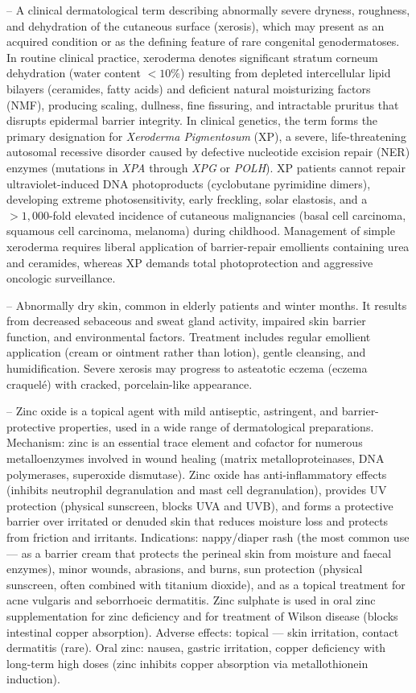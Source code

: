-- A clinical dermatological term describing abnormally severe dryness, roughness, and dehydration of the cutaneous surface (xerosis), which may present as an acquired condition or as the defining feature of rare congenital genodermatoses. In routine clinical practice, xeroderma denotes significant stratum corneum dehydration (water content $<10\%$) resulting from depleted intercellular lipid bilayers (ceramides, fatty acids) and deficient natural moisturizing factors (NMF), producing scaling, dullness, fine fissuring, and intractable pruritus that disrupts epidermal barrier integrity. In clinical genetics, the term forms the primary designation for \textit{Xeroderma Pigmentosum} (XP), a severe, life-threatening autosomal recessive disorder caused by defective nucleotide excision repair (NER) enzymes (mutations in \textit{XPA} through \textit{XPG} or \textit{POLH}). XP patients cannot repair ultraviolet-induced DNA photoproducts (cyclobutane pyrimidine dimers), developing extreme photosensitivity, early freckling, solar elastosis, and a $>1{,}000$-fold elevated incidence of cutaneous malignancies (basal cell carcinoma, squamous cell carcinoma, melanoma) during childhood. Management of simple xeroderma requires liberal application of barrier-repair emollients containing urea and ceramides, whereas XP demands total photoprotection and aggressive oncologic surveillance.

-- Abnormally dry skin, common in elderly patients and winter months. It results from decreased sebaceous and sweat gland activity, impaired skin barrier function, and environmental factors. Treatment includes regular emollient application (cream or ointment rather than lotion), gentle cleansing, and humidification. Severe xerosis may progress to asteatotic eczema (eczema craquelé) with cracked, porcelain-like appearance.

-- Zinc oxide is a topical agent with mild antiseptic, astringent, and barrier-protective properties, used in a wide range of dermatological preparations. Mechanism: zinc is an essential trace element and cofactor for numerous metalloenzymes involved in wound healing (matrix metalloproteinases, DNA polymerases, superoxide dismutase). Zinc oxide has anti-inflammatory effects (inhibits neutrophil degranulation and mast cell degranulation), provides UV protection (physical sunscreen, blocks UVA and UVB), and forms a protective barrier over irritated or denuded skin that reduces moisture loss and protects from friction and irritants. Indications: nappy/diaper rash (the most common use — as a barrier cream that protects the perineal skin from moisture and faecal enzymes), minor wounds, abrasions, and burns, sun protection (physical sunscreen, often combined with titanium dioxide), and as a topical treatment for acne vulgaris and seborrhoeic dermatitis. Zinc sulphate is used in oral zinc supplementation for zinc deficiency and for treatment of Wilson disease (blocks intestinal copper absorption). Adverse effects: topical — skin irritation, contact dermatitis (rare). Oral zinc: nausea, gastric irritation, copper deficiency with long-term high doses (zinc inhibits copper absorption via metallothionein induction).
